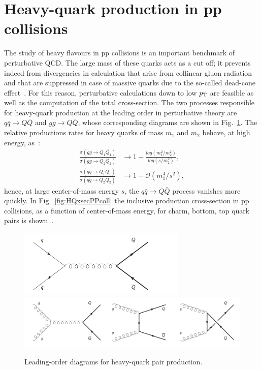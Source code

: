 \section{Heavy-quark production in pp collisions}
The study of heavy flavours in pp collisions is an important benchmark of perturbative QCD. 
The large mass of these quarks acts as a cut off; it prevents indeed from divergencies in calculation that arise
from collinear gluon radiation and that are suppressed in case of massive quarks due to the
so-called dead-cone effect~\cite{Dokshitzer:1991fd}. For this reason, perturbative calculations down to low $p_{\rm T}$ are feasible as well as the computation of the total cross-section. 
The two processes responsible for heavy-quark production at the leading order in perturbative theory are 
$q \bar{q} \rightarrow Q \bar{Q}$ and $gg \rightarrow Q \bar{Q}$, whose corresponding diagrams are
shown in Fig.~\ref{fig:LOdiagrams}. The relative productions rates for heavy quarks of mass 
$m_1$ and $m_2$ behave, at high energy, as~\cite{Mangano:1997ri}:
\begin{equation}
\begin{aligned}
\frac{\sigma (gg \rightarrow Q_1 \bar{Q_1})}{\sigma (gg \rightarrow Q_2 \bar{Q_2})} & \rightarrow 1 - \frac{log(m_1^2/m_2^2)}{log(s/m_2^2)}, \\
\frac{\sigma (q \bar{q} \rightarrow Q_1 \bar{Q_1})}{\sigma (q \bar{q} \rightarrow Q_2 \bar{Q_2})} & \rightarrow 1 - \mathcal{O} (m_1^4/s^2),
\end{aligned}
\end{equation}
hence, at large center-of-mass energy $s$, the $q \bar{q} \rightarrow Q \bar{Q}$ process
vanishes more quickly. In Fig.~\ref{fig:HQxsecPPcoll} the inclusive production cross-section in pp collisions,
as a function of center-of-mass energy, for charm, bottom, top quark pairs is shown~\cite{Mangano:1997ri}.
\begin{figure}[!ht]
  \centering
  \includegraphics[width=8cm]{FigCap2/Feymann1.png}
  \includegraphics[width=15cm]{FigCap2/Feymann2.png}
  \caption{Leading-order diagrams for heavy-quark pair production.}
  \label{fig:LOdiagrams}
\end{figure}
